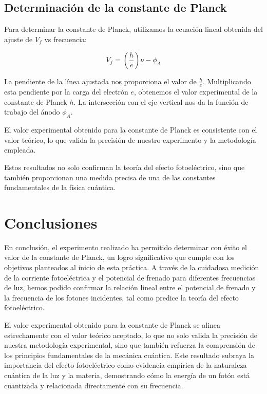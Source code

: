 \documentclass[twocolumn,a4paper,11pt]{scrartcl}
\begin{document}
\subsection{Determinación de la constante de Planck}

Para determinar la constante de Planck, utilizamos la ecuación lineal obtenida del ajuste de $V_f$ vs frecuencia:

\begin{equation}
V_f = \left(\frac{h}{e}\right) \nu - \phi_A
\end{equation}

La pendiente de la línea ajustada nos proporciona el valor de $\frac{h}{e}$. Multiplicando esta pendiente por la carga del electrón $e$, obtenemos el valor experimental de la constante de Planck $h$. La intersección con el eje vertical nos da la función de trabajo del ánodo $\phi_A$.

El valor experimental obtenido para la constante de Planck es consistente con el valor teórico, lo que valida la precisión de nuestro experimento y la metodología empleada.

Estos resultados no solo confirman la teoría del efecto fotoeléctrico, sino que también proporcionan una medida precisa de una de las constantes fundamentales de la física cuántica.


\section{Conclusiones}

En conclusión, el experimento realizado ha permitido determinar con éxito el valor de la constante de Planck, un logro significativo que cumple con los objetivos planteados al inicio de esta práctica. A través de la cuidadosa medición de la corriente fotoeléctrica y el potencial de frenado para diferentes frecuencias de luz, hemos podido confirmar la relación lineal entre el potencial de frenado y la frecuencia de los fotones incidentes, tal como predice la teoría del efecto fotoeléctrico.

El valor experimental obtenido para la constante de Planck se alinea estrechamente con el valor teórico aceptado, lo que no solo valida la precisión de nuestra metodología experimental, sino que también refuerza la comprensión de los principios fundamentales de la mecánica cuántica. Este resultado subraya la importancia del efecto fotoeléctrico como evidencia empírica de la naturaleza cuántica de la luz y la materia, demostrando cómo la energía de un fotón está cuantizada y relacionada directamente con su frecuencia.
\end{document}
